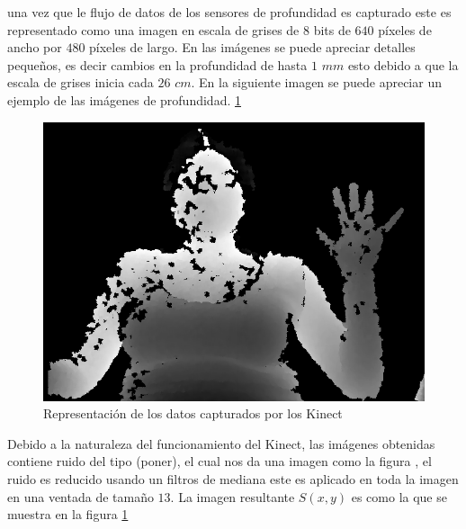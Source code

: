 una vez que le flujo de datos de los sensores de profundidad es capturado este es representado como una imagen en escala de grises de $8$ bits de $640$ p\'ixeles de ancho por $480$ p\'ixeles de largo. En las imágenes se puede apreciar detalles pequeños, es decir cambios en la profundidad de hasta $1$  $mm$ esto debido a que la escala de grises inicia cada $26$  $cm$. %
En la siguiente imagen se puede apreciar un ejemplo de las imágenes de profundidad. \ref{fig:ImagenCapturada}

\begin{figure}[!h]
\begin{center}
\includegraphics[scale=.5]{./Figures/166.png}
\end{center}
\caption{Representación de los datos capturados por los Kinect}
\label{fig:ImagenCapturada}
\end{figure}  

Debido a la naturaleza del funcionamiento del Kinect, las imágenes obtenidas contiene ruido del tipo (poner), el cual nos da una imagen como la figura  , el ruido  es reducido usando un filtros de mediana este es aplicado en toda la imagen en una ventada de tama\~no $13$. La imagen resultante $S(x,y)$ es como la que se muestra en la figura \ref{fig:ImagenCapturada}

